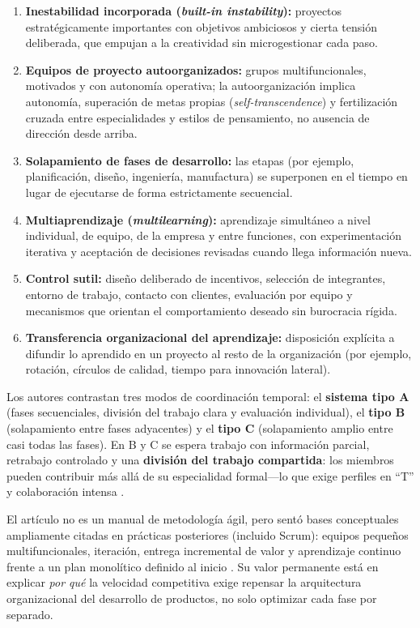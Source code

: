 \documentclass[conference]{IEEEtran}
\begin{document}
\begin{enumerate}
    \item \textbf{Inestabilidad incorporada (\emph{built-in instability}):} proyectos estratégicamente importantes con objetivos ambiciosos y cierta tensión deliberada, que empujan a la creatividad sin microgestionar cada paso.
    \item \textbf{Equipos de proyecto autoorganizados:} grupos multifuncionales, motivados y con autonomía operativa; la autoorganización implica autonomía, superación de metas propias (\emph{self-transcendence}) y fertilización cruzada entre especialidades y estilos de pensamiento, no ausencia de dirección desde arriba.
    \item \textbf{Solapamiento de fases de desarrollo:} las etapas (por ejemplo, planificación, diseño, ingeniería, manufactura) se superponen en el tiempo en lugar de ejecutarse de forma estrictamente secuencial.
    \item \textbf{Multiaprendizaje (\emph{multilearning}):} aprendizaje simultáneo a nivel individual, de equipo, de la empresa y entre funciones, con experimentación iterativa y aceptación de decisiones revisadas cuando llega información nueva.
    \item \textbf{Control sutil:} diseño deliberado de incentivos, selección de integrantes, entorno de trabajo, contacto con clientes, evaluación por equipo y mecanismos que orientan el comportamiento deseado sin burocracia rígida.
    \item \textbf{Transferencia organizacional del aprendizaje:} disposición explícita a difundir lo aprendido en un proyecto al resto de la organización (por ejemplo, rotación, círculos de calidad, tiempo para innovación lateral).
\end{enumerate}

Los autores contrastan tres modos de coordinación temporal: el \textbf{sistema tipo A} (fases secuenciales, división del trabajo clara y evaluación individual), el \textbf{tipo B} (solapamiento entre fases adyacentes) y el \textbf{tipo C} (solapamiento amplio entre casi todas las fases). En B y C se espera trabajo con información parcial, retrabajo controlado y una \textbf{división del trabajo compartida}: los miembros pueden contribuir más allá de su especialidad formal---lo que exige perfiles en ``T'' y colaboración intensa \cite{takeuchiNonaka1986nndp}.

El artículo no es un manual de metodología ágil, pero sentó bases conceptuales ampliamente citadas en prácticas posteriores (incluido Scrum): equipos pequeños multifuncionales, iteración, entrega incremental de valor y aprendizaje continuo frente a un plan monolítico definido al inicio \cite{takeuchiNonaka1986nndp}. Su valor permanente está en explicar \emph{por qué} la velocidad competitiva exige repensar la arquitectura organizacional del desarrollo de productos, no solo optimizar cada fase por separado.
\end{document}
